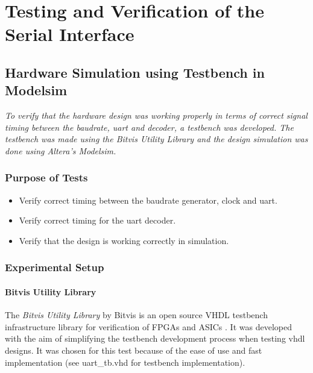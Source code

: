 \documentclass[main.tex]{subfiles}
\begin{document}
\chapter{Testing and Verification of the Serial Interface} \label{chap:sertest}

\section{Hardware Simulation using Testbench in Modelsim}

\textit{To verify that the hardware design was working properly in terms of correct signal timing between the baudrate, \acrshort{uart} and decoder, a testbench was developed. The testbench was made using the \textit{Bitvis Utility Library} and the design simulation was done using Altera's Modelsim.}

\subsection{Purpose of Tests}

\begin{itemize}\setlength{\itemsep}{10pt}
\item Verify correct timing between the baudrate generator, clock and uart.
\item Verify correct timing for the uart decoder.
\item Verify that the design is working correctly in simulation.
\end{itemize}

\subsection{Experimental Setup}
\subsubsection{Bitvis Utility Library}
The \textit{Bitvis Utility Library} by Bitvis is an open source VHDL testbench infrastructure library for verification of FPGAs and ASICs \cite{bitvis16}. It was developed with the aim of simplifying the testbench development process when testing \acrshort{vhdl} designs. It was chosen for this test because of the ease of use and fast implementation (see uart\_tb.vhd for testbench implementation).\\
\end{document}
